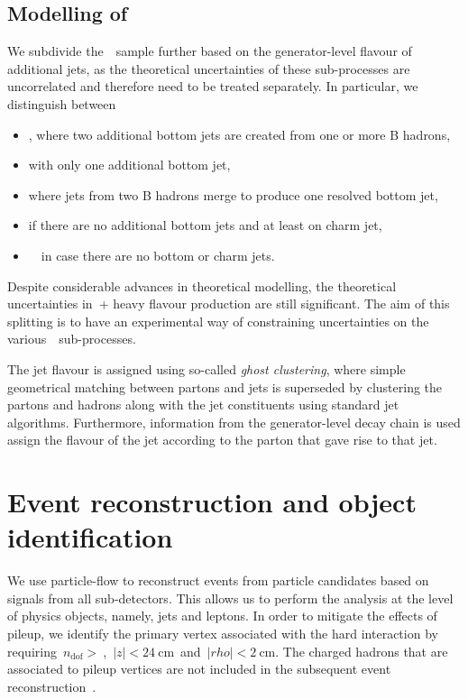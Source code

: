 \subsection{Modelling of \ttbar}
\label{sec:ttbar_subprocesses}
We subdivide the~\ttbar~sample further based on the generator-level flavour of additional jets, as the theoretical uncertainties of these sub-processes are uncorrelated and therefore need to be treated separately. In particular, we distinguish between
\begin{itemize}
\item \ttbb, where two additional bottom jets are created from one or more B hadrons,
\item \ttb with only one additional bottom jet,
\item \tttwob where jets from two B hadrons merge to produce one resolved bottom jet,
\item \ttcc if there are no additional bottom jets and at least on charm jet,
\item~\ttlf~in case there are no bottom or charm jets.
\end{itemize}
Despite considerable advances in theoretical modelling, the theoretical uncertainties in~\ttbar + heavy flavour production are still significant\cite{Cascioli:2013era}. The aim of this splitting is to have an experimental way of constraining uncertainties on the various~\ttbar~sub-processes.

The jet flavour is assigned using so-called \textit{ghost clustering}, where simple geometrical matching between partons and jets is superseded by clustering the partons and hadrons along with the jet constituents using standard jet algorithms. Furthermore, information from the generator-level decay chain is used assign the flavour of the jet according to the parton that gave rise to that jet\cite{Bartosik:2047049}.

\section{Event reconstruction and object identification}
\label{sec:object_id}
We use particle-flow to reconstruct events from particle candidates based on signals from all sub-detectors. This allows us to perform the analysis at the level of physics objects, namely, jets and leptons\cite{cms_particleflow:2017}. In order to mitigate the effects of pileup, we identify the primary vertex associated with the hard interaction by requiring~$n_{\mathrm{dof}} >~$,~$|z| < 24~\mathrm{cm}$~and~$|rho|<2~\mathrm{cm}$. The charged hadrons that are associated to pileup vertices are not included in the subsequent event reconstruction~\cite{CMS:2014ata}.

